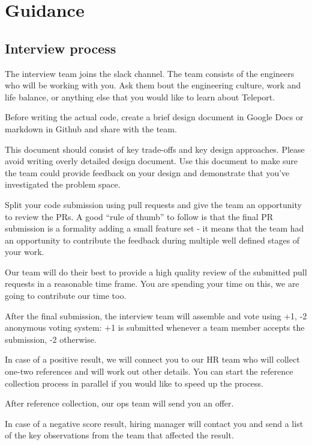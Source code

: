 \documentclass{article}
\begin{document}
\section{Guidance}

\subsection{Interview process}

The interview team joins the slack channel. The team consists of the engineers who will be working with you.
Ask them bout the engineering culture, work and life balance, or anything else that you would like to learn about Teleport.
  
Before writing the actual code, create a brief design document in Google Docs or markdown in Github and share with the team.

This document should consist of key trade-offs and key design approaches. Please avoid writing overly detailed design document. Use this document to make sure the team could provide feedback on your design and demonstrate that you've investigated the problem space.

Split your code submission using pull requests and give the team an opportunity to review the PRs. A good “rule of thumb” to follow is that the final PR submission is a formality adding a small feature set - it means that the team had an opportunity to contribute the feedback during multiple well defined stages of your work.

Our team will do their best to provide a high quality review of the submitted pull requests in a reasonable time frame. You are spending your time on this, we are going to contribute our time too.

After the final submission, the interview team will assemble and vote using +1, -2 anonymous voting system: +1 is submitted whenever a team member accepts the submission, -2 otherwise.

In case of a positive result, we will connect you to our HR team who will collect one-two references and will work out other details. You can start the reference collection process in parallel if you would like to speed up the process.

After reference collection, our ops team will send you an offer.

In case of a negative score result, hiring manager will contact you and send a list of the key observations from the team that affected the result.
\end{document}
